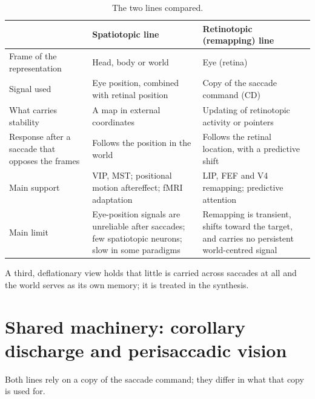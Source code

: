 \documentclass[11pt,a4paper]{article}
\begin{document}
\begin{table}[h]
\centering\footnotesize
\setlength{\tabcolsep}{3pt}
\begin{tabular}{@{}>{\raggedright\arraybackslash}p{2.6cm}>{\raggedright\arraybackslash}p{6.4cm}>{\raggedright\arraybackslash}p{6.4cm}@{}}
\toprule
 & Spatiotopic line & Retinotopic (remapping) line \\
\midrule
Frame of the representation & Head, body or world & Eye (retina) \\
Signal used & Eye position, combined with retinal position & Copy of the saccade command (CD) \\
What carries stability & A map in external coordinates & Updating of retinotopic activity or pointers \\
Response after a saccade that opposes the frames & Follows the position in the world & Follows the retinal location, with a predictive shift \\
Main support & VIP, MST; positional motion aftereffect; fMRI adaptation & LIP, FEF and V4 remapping; predictive attention \\
Main limit & Eye-position signals are unreliable after saccades; few spatiotopic neurons; slow in some paradigms & Remapping is transient, shifts toward the target, and carries no persistent world-centred signal \\
\bottomrule
\end{tabular}
\caption{The two lines compared.}
\end{table}

A third, deflationary view holds that little is carried across saccades at all and the world serves as its own memory; it is treated in the synthesis.

\section{Shared machinery: corollary discharge and perisaccadic vision}

Both lines rely on a copy of the saccade command; they differ in what that copy is used for.
\end{document}
